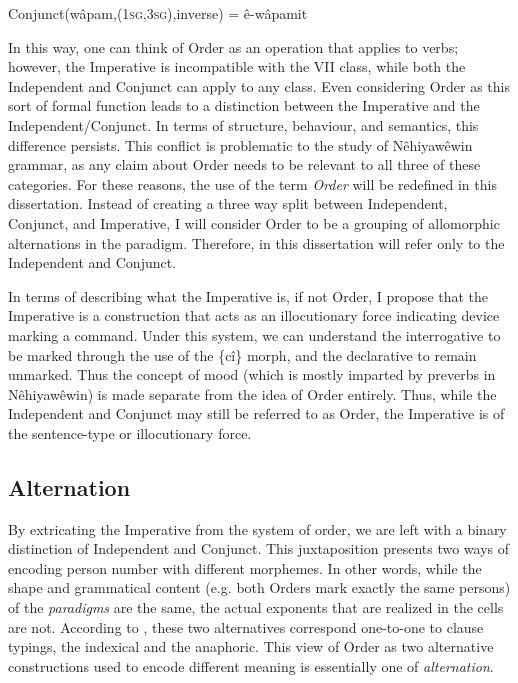 \begin{exe}
 \ex \mbox{Conjunct}(\mbox{wâpam},(\mbox{1\textsc{sg}},\mbox{3\textsc{sg}}),\mbox{inverse}) = \mbox{ê-wâpamit}
 \label{funct}
\end{exe}

In this way, one can think of Order as an operation that applies to verbs; however, the Imperative is incompatible with the VII class, while both the Independent and Conjunct can apply to any class. Even considering Order as this sort of formal function leads to a distinction between the Imperative and the Independent/Conjunct. In terms of structure, behaviour, and semantics, this difference persists. This conflict is problematic to the study of Nêhiyawêwin grammar, as any claim about Order needs to be relevant to all three of these categories. For these reasons, the use of the term \textit{Order} will be redefined in this dissertation. Instead of creating a three way split between Independent, Conjunct, and Imperative, I will consider Order to be a grouping of allomorphic alternations in the paradigm. Therefore, in this dissertation will refer only to the Independent and Conjunct. 

In terms of describing what the Imperative is, if not Order, I propose that the Imperative is a construction that acts as an illocutionary force indicating device \citep{searle1985speech} marking a command. Under this system, we can understand the interrogative to be marked through the use of the \{cî\} morph, and the declarative to remain unmarked. Thus the concept of mood (which is mostly imparted by preverbs in Nêhiyawêwin) is made separate from the idea of Order entirely. Thus, while the Independent and Conjunct may still be referred to as Order, the Imperative is of the sentence-type or illocutionary force. 

\subsection{Alternation}

By extricating the Imperative from the system of order, we are left with a binary distinction of Independent and Conjunct. This juxtaposition presents two ways of encoding person number with different morphemes. In other words, while the shape and grammatical content (e.g. both Orders mark exactly the same persons) of the \textit{paradigms} are the same, the actual exponents that are realized in the cells are not. According to \citet{Cook2014}, these two alternatives correspond one-to-one to clause typings, the indexical and the anaphoric. This view of Order as two alternative constructions used to encode different meaning is essentially one of \textit{alternation}.


